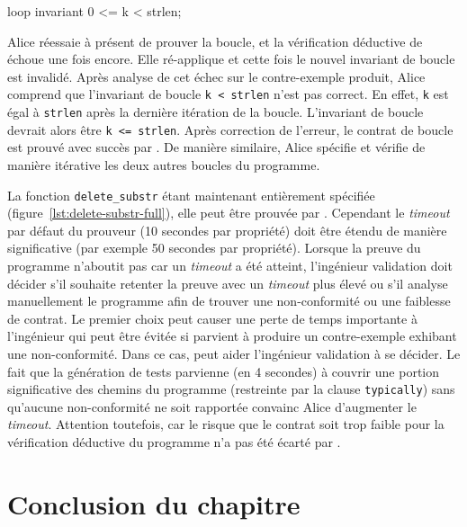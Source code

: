 \begin{pretty-codeACSL}
loop invariant 0 <= k < strlen;
\end{pretty-codeACSL}

Alice réessaie à présent de prouver la boucle, et la vérification déductive de
\Wp échoue une fois encore.
Elle ré-applique \NCD et cette fois le nouvel invariant de boucle est invalidé.
Après analyse de cet échec sur le contre-exemple produit, Alice comprend que
l'invariant de boucle \lstinline{k < strlen} n'est pas correct.
En effet, \lstinline{k} est égal à \lstinline{strlen} après la dernière
itération de la boucle.
L'invariant de boucle devrait alors être \lstinline{k <= strlen}.
Après correction de l'erreur, le contrat de boucle est prouvé avec succès par
\Wp.
De manière similaire, Alice spécifie et vérifie de manière itérative les deux
autres boucles du programme.

La fonction \lstinline{delete_substr} étant maintenant entièrement spécifiée
(figure~\ref{lst:delete-substr-full}), elle peut être prouvée par \Wp.
Cependant le {\em timeout} par défaut du prouveur (10 secondes par propriété)
doit être étendu de manière significative (par exemple 50 secondes par
propriété).
Lorsque la preuve du programme n'aboutit pas car un {\em timeout} a été atteint,
l'ingénieur validation doit décider s'il souhaite retenter la preuve avec
un {\em timeout} plus élevé ou s'il analyse manuellement le programme afin de
trouver une non-conformité ou une faiblesse de contrat.
Le premier choix peut causer une perte de temps importante à l'ingénieur qui
peut être évitée si \NCD parvient à produire un contre-exemple exhibant une
non-conformité.
Dans ce cas, \NCD peut aider l'ingénieur validation à se décider.
Le fait que la génération de tests parvienne (en 4 secondes) à couvrir une
portion significative des chemins du programme (restreinte par la clause
\lstinline'typically') sans qu'aucune non-conformité ne soit rapportée convainc
Alice d'augmenter le {\em timeout}.
Attention toutefois, car le risque que le contrat soit trop faible pour la
vérification déductive du programme n'a pas été écarté par \NCD.


\section*{Conclusion du chapitre}


